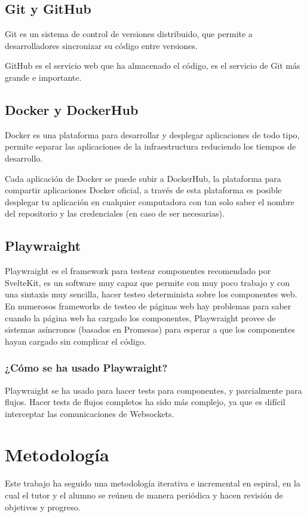 \subsection{Git y GitHub}
Git es un sistema de control de versiones distribuido, que permite a desarrolladores sincronizar su código entre versiones.

GitHub es el servicio web que ha almacenado el código, es el servicio de Git más grande e importante.

\subsection{Docker y DockerHub}
Docker es una plataforma para desarrollar y desplegar aplicaciones de todo tipo, permite separar las aplicaciones de la infraestructura reduciendo los tiempos de desarrollo.

Cada aplicación de Docker se puede subir a DockerHub, la plataforma para compartir aplicaciones Docker oficial, a través de esta plataforma es posible desplegar tu aplicación en cualquier computadora con tan solo saber el nombre del repositorio y las credenciales (en caso de ser necesarias).

\subsection{Playwraight}
Playwraight \cite{playwright_docs} es el framework para testear componentes recomendado por SvelteKit, es un software muy capaz que permite con muy poco trabajo y con una sintaxis muy sencilla, hacer testeo determinista sobre los componentes web. En numerosos frameworks de testeo de páginas web hay problemas para saber cuando la página web ha cargado los componentes, Playwraight provee de sistemas asíncronos (basados en Promesas) para esperar a que los componentes hayan cargado sin complicar el código.

\subsubsection{¿Cómo se ha usado Playwraight?}
Playwraight se ha usado para hacer tests para componentes, y parcialmente para flujos. Hacer tests de flujos completos ha sido más complejo, ya que es difícil interceptar las comunicaciones de Websockets.

\section{Metodología}
Este trabajo ha seguido una metodología iterativa e incremental en espiral, en la cual el tutor y el alumno se reúnen de manera periódica y hacen revisión de objetivos y progreso.

